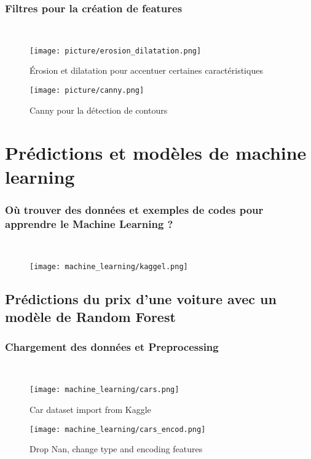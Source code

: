 \documentclass{beamer}
\theoremstyle{definition}
\begin{document}
\begin{frame}
	\frametitle{Filtres pour la création de features}
	\hfill\\[-1cm]
	\begin{minipage}[t]{1\linewidth}
		\centering
	
	\begin{minipage}[t]{0.54\linewidth}
			\centering
			\begin{figure}
				\centering
				\texttt{[image: picture/erosion\_dilatation.png]}
				\caption*{Érosion et dilatation pour accentuer certaines caractéristiques}
			\end{figure}			
		\end{minipage}
		\hfil\begin{minipage}[t]{0.37\linewidth}
		\centering
		\begin{figure}
			\centering
			\texttt{[image: picture/canny.png]}
			\caption*{Canny pour la détection de contours}
		\end{figure}
		
	\end{minipage}
	\end{minipage}
	
\end{frame}

\section{Prédictions et modèles de machine learning}

\begin{frame}
	\frametitle{Où trouver des données et exemples de codes pour apprendre le Machine Learning ? }
		\centering
		\hfill\\[-0.8cm]
		\begin{figure}
			\centering
			\texttt{[image: machine\_learning/kaggel.png]}
			\caption*{}

		\end{figure}	

\end{frame}

\subsection{Prédictions du prix d'une voiture avec un modèle de Random Forest}
\begin{frame}
	\frametitle{Chargement des données et Preprocessing}
	\begin{minipage}[t]{1\linewidth}
		\centering
	\hfill\\[-0.8cm]
			\begin{figure}
				\centering
				\texttt{[image: machine\_learning/cars.png]}
				\caption*{Car dataset import from Kaggle  }
				\texttt{[image: machine\_learning/cars\_encod.png]}
				\caption*{Drop Nan, change type and encoding features}
			\end{figure}

	\end{minipage}	
\end{frame}
\end{document}
